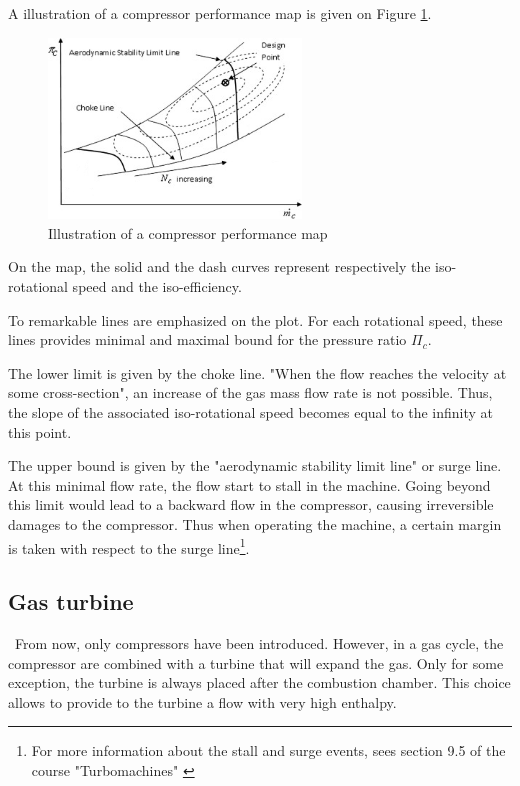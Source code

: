 A illustration of a compressor performance map is given on Figure \ref{fig:C3_compmap}.
\begin{figure}[h]
\centering
\includegraphics[width=0.6\textwidth]{Comp_Map.png}
\caption{Illustration of a compressor performance map \citep{Ghorbanian2009}}
\label{fig:C3_compmap}
\end{figure}  

On the map, the solid and the dash curves represent respectively the iso-rotational speed and the iso-efficiency.

To remarkable lines are emphasized on the plot. For each rotational speed, these lines provides minimal and maximal bound for the pressure ratio $\Pi_c$. 

The lower limit is given by the choke line. "When the flow reaches the velocity at some cross-section"\citep{Ghorbanian2009}, an increase of the gas mass flow rate is not possible. Thus, the slope of the associated iso-rotational speed becomes equal to the infinity at this point. 

The upper bound is given by the "aerodynamic stability limit line" or surge line. At this minimal flow rate, the flow start to stall in the machine. Going beyond this limit would lead to a backward flow in the compressor, causing irreversible damages to the compressor. Thus when operating the machine, a certain margin is taken with respect to the surge line\footnote{For more information about the stall and surge events, sees section 9.5 of the course "Turbomachines" \citep{Hillewaert2019}}.

\subsection{Gas turbine}
\quad\, From now, only compressors have been introduced. However, in a gas cycle, the compressor are combined with a turbine that will expand the gas. Only for some exception, the turbine is always placed after the combustion chamber. This choice allows to provide to the turbine a flow with very high enthalpy.

